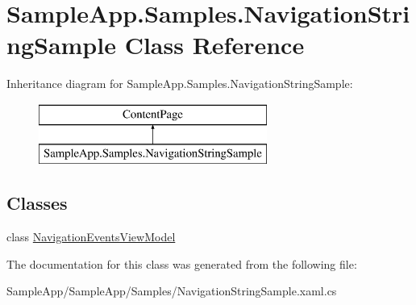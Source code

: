 \hypertarget{class_sample_app_1_1_samples_1_1_navigation_string_sample}{}\section{Sample\+App.\+Samples.\+Navigation\+String\+Sample Class Reference}
\label{class_sample_app_1_1_samples_1_1_navigation_string_sample}
Inheritance diagram for Sample\+App.\+Samples.\+Navigation\+String\+Sample\+:\begin{figure}[H]
\begin{center}
\leavevmode
\includegraphics[height=2.000000cm]{class_sample_app_1_1_samples_1_1_navigation_string_sample}
\end{center}
\end{figure}
\subsection*{Classes}
\begin{DoxyCompactItemize}
\item 
class \hyperlink{class_sample_app_1_1_samples_1_1_navigation_string_sample_1_1_navigation_events_view_model}{Navigation\+Events\+View\+Model}
\end{DoxyCompactItemize}


The documentation for this class was generated from the following file\+:\begin{DoxyCompactItemize}
\item 
Sample\+App/\+Sample\+App/\+Samples/Navigation\+String\+Sample.\+xaml.\+cs\end{DoxyCompactItemize}
